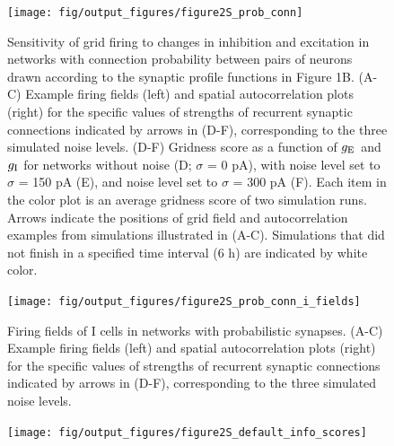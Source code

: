 \documentclass[a4paper,12pt]{article}
\newcommand{\ssc}[3]{\ensuremath{#1_{\text{#2}_{\text{#3}}}}}
\newcommand{\gE      }{\ssc{g}      {\scriptsize{E}}{}}
\newcommand{\gI      }{\ssc{g}      {\scriptsize{I}}{}}
\begin{document}
\begin{figure}[p]
    \internallinenumbers
    \centering
        \texttt{[image: fig/output\_figures/figure2S\_prob\_conn]}
    \caption{Sensitivity of grid firing to changes in inhibition and excitation
    in networks with connection probability between pairs of neurons drawn
    according to the synaptic profile functions in Figure 1B. (A-C) Example
    firing fields (left) and spatial autocorrelation plots (right) for the
    specific values of strengths of recurrent synaptic connections indicated by
    arrows in (D-F), corresponding to the three simulated noise levels.  (D-F)
    Gridness score as a function of $\gE$ and $\gI$ for networks without noise (D;
    $\sigma$ = 0 pA), with noise level set to $\sigma$ = 150 pA (E), and noise
    level set to $\sigma$ = 300 pA (F). Each item in the color plot is an
    average gridness score of two simulation runs. Arrows indicate the
    positions of grid field and autocorrelation examples from simulations
    illustrated in (A-C). Simulations that did not finish in a specified time
    interval (6 h) are indicated by white color.}
\end{figure}

\clearpage

\begin{figure}[p]
    \internallinenumbers
    \centering
        \texttt{[image: fig/output\_figures/figure2S\_prob\_conn\_i\_fields]}
    \caption{Firing fields of I cells in networks with probabilistic synapses.
    (A-C) Example firing fields (left) and spatial autocorrelation plots
    (right) for the specific values of strengths of recurrent synaptic
    connections indicated by arrows in (D-F), corresponding to the three
    simulated noise levels.
    }
\end{figure}

\clearpage

%

\begin{figure}[p]
    \internallinenumbers
    \centering
        \texttt{[image: fig/output\_figures/figure2S\_default\_info\_scores]}
    \caption{}
\end{figure}
\end{document}
